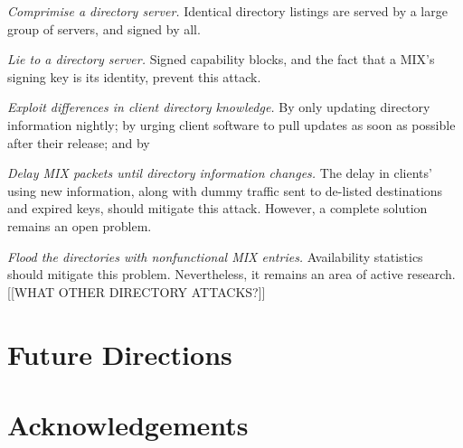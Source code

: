 \documentclass{llncs}
\begin{document}
\begin{description}
\item \emph{Comprimise a directory server.} Identical directory listings
  are served by a large group of servers, and signed by all.
\item \emph{Lie to a directory server.}  Signed capability blocks, and
  the fact that a MIX's signing key is its identity, prevent this
  attack.
\item \emph{Exploit differences in client directory knowledge.}  By
  only updating directory information nightly; by urging client
  software to pull updates as soon as possible after their release;
  and by 
\item \emph{Delay MIX packets until directory information changes.}
  The delay in clients' using new information, along with dummy
  traffic sent to de-listed destinations and expired keys, should
  mitigate this attack. However, a complete solution remains an
  open problem.
\item \emph{Flood the directories with nonfunctional MIX entries.}
  Availability statistics should mitigate this problem.  Nevertheless,
  it remains an area of active research. \cite{mix-acc} \cite{casc-rep}
[[WHAT OTHER DIRECTORY ATTACKS?]]
\end{description}


\section{Future Directions}
\label{sec:conclusion}


\section*{Acknowledgements}


 
\end{document}
